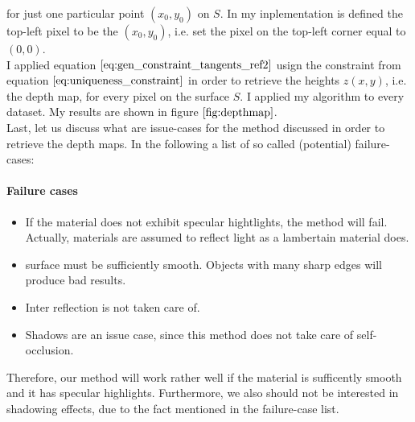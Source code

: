 \documentclass{paper}
\begin{document}
for just one particular point $(x_0, y_0)$ on $S$. In my inplementation is defined the top-left pixel to be the $(x_0, y_0)$, i.e. set the pixel on the top-left corner equal to $(0,0)$. \\

I applied equation $\ref{eq:gen_constraint_tangents_ref2}$ usign the constraint from equation $\ref{eq:uniqueness_constraint}$ in order to retrieve the heights $z(x,y)$, i.e. the depth map, for every pixel on the surface $S$. I applied my algorithm to every dataset. My results are shown in figure $\ref{fig:depthmap}$. \\

Last, let us discuss what are issue-cases for the method discussed in order to retrieve the depth maps. In the following a list of so called (potential) failure-cases:
    
\paragraph{Failure cases}
\begin{itemize}
    \item If the material does not exhibit specular hightlights, the method will fail. Actually, materials are assumed to reflect light as a lambertain material does.
    \item surface must be sufficiently smooth. Objects with many sharp edges will produce bad results.
    \item Inter reflection is not taken care of.
    \item Shadows are an issue case, since this method does not take care of self-occlusion.
\end{itemize}

Therefore, our method will work rather well if the material is sufficently smooth and it has specular highlights. Furthermore, we also should not be interested in shadowing effects, due to the fact mentioned in the failure-case list.
\end{document}
